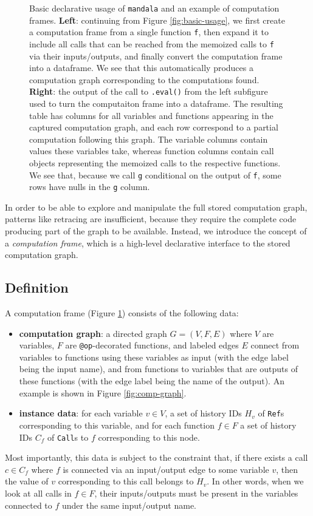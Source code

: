 \documentclass{article} %
\begin{document}
\begin{figure}[h]
\begin{subfigure}{0.47\textwidth}
\end{subfigure}
\caption{Basic declarative usage of \texttt{mandala} and an example of
computation frames. \textbf{Left}: continuing from Figure
\ref{fig:basic-usage}, we first create a computation frame from a single
function \texttt{f}, then expand it to include all calls that can be reached
from the memoized calls to \texttt{f} via their inputs/outputs, and finally
convert the computation frame into a dataframe. We see that this automatically
produces a computation graph corresponding to the computations found. \textbf{Right}:
the output of the call to \texttt{.eval()} from the left subfigure used to turn
the computaiton frame into a dataframe. The resulting table has columns for all
variables and functions appearing in the captured computation graph, and each
row correspond to a partial computation following this graph. The variable
columns contain values these variables take, whereas function columns contain
call objects representing the memoized calls to the respective functions. We see
that, because we call \texttt{g} conditional on the output of \texttt{f}, some
rows have nulls in the \texttt{g} column.}
\label{fig:cf}
\end{figure}

In order to be able to explore and manipulate the full stored computation graph,
patterns like retracing are insufficient, because they require the complete code
producing part of the graph to be available. Instead, we introduce the concept
of a \emph{computation frame}, which is a high-level declarative interface to
the stored computation graph. 

\subsection{Definition}
\label{subsection:}
A computation frame (Figure \ref{fig:cf}) consists of the following data:
\begin{itemize}
\item \textbf{computation graph}: a directed graph $G=(V,F,E)$ where $V$ are
variables, $F$ are \texttt{@op}-decorated functions, and labeled edges $E$
connect from variables to functions using these variables as input (with the
edge label being the input name), and from functions to variables that are
outputs of these functions (with the edge label being the name of the output). An example is shown in Figure \ref{fig:comp-graph}.
\item \textbf{instance data}: for each variable $v\in V$, a set of history
IDs $H_v$ of \texttt{Ref}s corresponding to this variable, and for each function
$f\in F$ a set of history IDs $C_f$ of \texttt{Call}s to $f$ corresponding to
this node. 
\end{itemize}
Most importantly, this data is subject to the constraint that, if there exists a
call $c\in C_f$ where $f$ is connected via an input/output edge to some variable
$v$, then the value of $v$ corresponding to this call belongs to $H_v$. In other
words, when we look at all calls in $f\in F$, their inputs/outputs  must be
present in the variables connected to $f$ under the same input/output name. 
\end{document}
